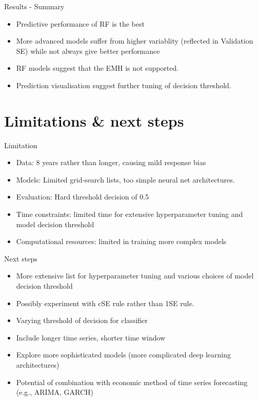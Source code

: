 \documentclass[aspectratio=169,t]{beamer} %
\begin{document}
\begin{frame}{Results - Summary}
\begin{itemize}
  \item Predictive performance of RF is the best
  \item More advanced models suffer from higher variablity (reflected in Validation SE) while not always give better performance
  \item RF models suggest that the EMH is not supported.
  \item Prediction visualisation suggest further tuning of decision threshold.
\end{itemize}
\end{frame}

\section{Limitations \& next steps}
\begin{frame}{Limitation}

  \begin{itemize}
    \item Data: 8 years rather than longer, causing mild response bias
    \item Models: Limited grid-search lists, too simple neural net architectures.
    \item Evaluation: Hard threshold decision of 0.5
    \item Time constraints: limited time for extensive hyperparameter tuning and model decision threshold
    \item Computational resources: limited in training more complex models
    \end{itemize}
\end{frame}

\begin{frame}{Next steps}

\begin{itemize}
  \item More extensive list for hyperparameter tuning and various choices of model decision threshold
  \item Possibly experiment with cSE rule rather than 1SE rule.
  \item Varying threshold of decision for classifier
  \item Include longer time series, shorter time window
  \item Explore more sophisticated models (more complicated deep learning architectures)
  \item Potential of combination with economic method of time series forecasting (e.g., ARIMA, GARCH)
\end{itemize}
\end{frame}
\end{document}
